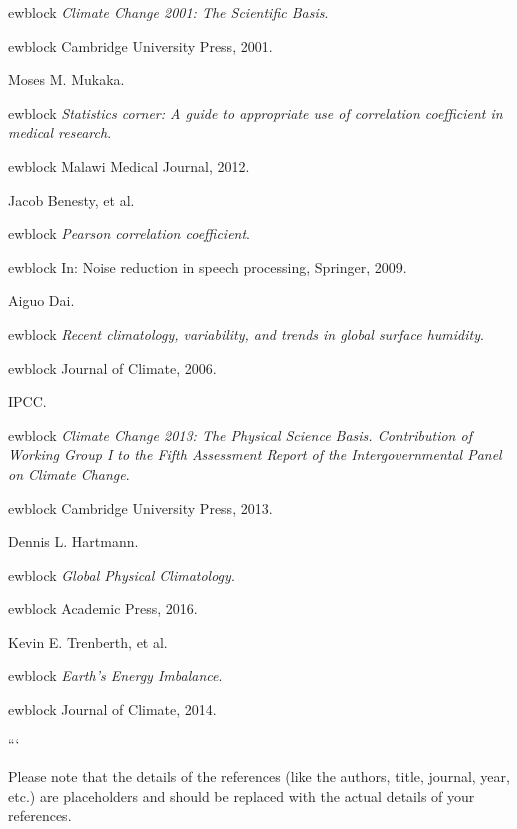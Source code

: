 \documentclass{article}
\begin{document}
\begin{thebibliography}{10}
ewblock {\em Climate Change 2001: The Scientific Basis}.

ewblock Cambridge University Press, 2001.

Moses M. Mukaka.

ewblock {\em Statistics corner: A guide to appropriate use of correlation coefficient in medical research}.

ewblock Malawi Medical Journal, 2012.

Jacob Benesty, et al.

ewblock {\em Pearson correlation coefficient}.

ewblock In: Noise reduction in speech processing, Springer, 2009.

Aiguo Dai.

ewblock {\em Recent climatology, variability, and trends in global surface humidity}.

ewblock Journal of Climate, 2006.

IPCC.

ewblock {\em Climate Change 2013: The Physical Science Basis. Contribution of Working Group I to the Fifth Assessment Report of the Intergovernmental Panel on Climate Change}.

ewblock Cambridge University Press, 2013.

Dennis L. Hartmann.

ewblock {\em Global Physical Climatology}.

ewblock Academic Press, 2016.

Kevin E. Trenberth, et al.

ewblock {\em Earth’s Energy Imbalance}.

ewblock Journal of Climate, 2014.

\end{thebibliography}
```

Please note that the details of the references (like the authors, title, journal, year, etc.) are placeholders and should be replaced with the actual details of your references.
\end{document}
